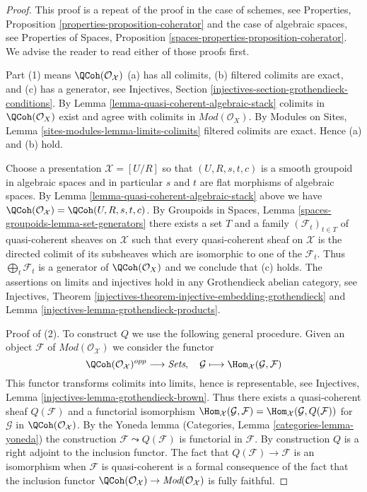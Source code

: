 \begin{proof}
This proof is a repeat of the proof in the case of schemes, see
Properties, Proposition \ref{properties-proposition-coherator}
and the case of algebraic spaces, see
Properties of Spaces, Proposition
\ref{spaces-properties-proposition-coherator}.
We advise the reader to read either of those proofs first.

\medskip\noindent
Part (1) means $\QCoh(\mathcal{O}_\mathcal{X})$ (a) has all colimits,
(b) filtered colimits are exact, and (c) has a generator, see
Injectives, Section \ref{injectives-section-grothendieck-conditions}.
By Lemma \ref{lemma-quasi-coherent-algebraic-stack}
colimits in $\QCoh(\mathcal{O}_X)$ exist and agree
with colimits in $\textit{Mod}(\mathcal{O}_X)$. By
Modules on Sites, Lemma \ref{sites-modules-lemma-limits-colimits}
filtered colimits are exact. Hence (a) and (b) hold.

\medskip\noindent
Choose a presentation $\mathcal{X} = [U/R]$ so that $(U, R, s, t, c)$
is a smooth groupoid in algebraic spaces and in particular $s$ and $t$
are flat morphisms of algebraic spaces. By
Lemma \ref{lemma-quasi-coherent-algebraic-stack}
above we have
$\QCoh(\mathcal{O}_\mathcal{X}) = \QCoh(U, R, s, t, c)$.
By Groupoids in Spaces, Lemma \ref{spaces-groupoids-lemma-set-generators}
there exists a set $T$ and a family $(\mathcal{F}_t)_{t \in T}$ of
quasi-coherent sheaves on $\mathcal{X}$ such that every quasi-coherent
sheaf on $\mathcal{X}$ is the directed colimit of its subsheaves
which are isomorphic to one of the $\mathcal{F}_t$.
Thus $\bigoplus_t \mathcal{F}_t$ is
a generator of $\QCoh(\mathcal{O}_X)$ and we conclude that (c) holds.
The assertions on limits and injectives hold in any
Grothendieck abelian category, see
Injectives, Theorem
\ref{injectives-theorem-injective-embedding-grothendieck} and
Lemma \ref{injectives-lemma-grothendieck-products}.

\medskip\noindent
Proof of (2). To construct $Q$ we use the following general procedure.
Given an object $\mathcal{F}$ of $\textit{Mod}(\mathcal{O}_\mathcal{X})$
we consider the functor
$$
\QCoh(\mathcal{O}_\mathcal{X})^{opp}
\longrightarrow
\textit{Sets},
\quad
\mathcal{G}
\longmapsto
\Hom_\mathcal{X}(\mathcal{G}, \mathcal{F})
$$
This functor transforms colimits into limits,
hence is representable, see
Injectives, Lemma \ref{injectives-lemma-grothendieck-brown}.
Thus there exists a quasi-coherent sheaf $Q(\mathcal{F})$
and a functorial isomorphism
$\Hom_\mathcal{X}(\mathcal{G}, \mathcal{F}) =
\Hom_\mathcal{X}(\mathcal{G}, Q(\mathcal{F}))$
for $\mathcal{G}$ in $\QCoh(\mathcal{O}_\mathcal{X})$.
By the Yoneda lemma
(Categories, Lemma \ref{categories-lemma-yoneda})
the construction $\mathcal{F} \leadsto Q(\mathcal{F})$ is
functorial in $\mathcal{F}$. By construction $Q$ is a right
adjoint to the inclusion functor.
The fact that $Q(\mathcal{F}) \to \mathcal{F}$ is an isomorphism
when $\mathcal{F}$ is quasi-coherent is a formal consequence of the fact
that the inclusion functor
$\QCoh(\mathcal{O}_\mathcal{X}) \to
\textit{Mod}(\mathcal{O}_\mathcal{X})$
is fully faithful.
\end{proof}









